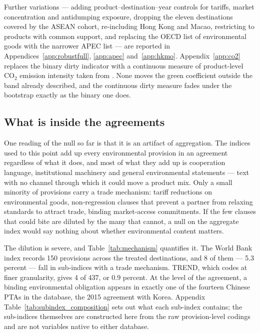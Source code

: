 \documentclass[12pt]{article}
\begin{document}
Further variations --- adding product--destination--year controls for tariffs, market concentration
and antidumping exposure, dropping the eleven destinations covered by the ASEAN cohort, re-including
Hong Kong and Macao, restricting to products with common support, and replacing the OECD list of
environmental goods with the narrower APEC list --- are reported in
Appendices~\ref{app:robustfull}, \ref{app:apec} and~\ref{app:hkmo}. Appendix~\ref{app:co2} replaces
the binary dirty indicator with a continuous measure of product-level CO$_2$ emission intensity taken
from \citet{shapiro2021}. None moves the green coefficient outside the band already described, and
the continuous dirty measure fades under the bootstrap exactly as the binary one does.



\FloatBarrier
\subsection{What is inside the agreements}\label{sec:bundling}

One reading of the null so far is that it is an artifact of aggregation. The indices used to this
point add up every environmental provision in an agreement regardless of what it does, and most of
what they add up is cooperation language, institutional machinery and general environmental
statements --- text with no channel through which it could move a product mix. Only a small minority
of provisions carry a trade mechanism: tariff reductions on environmental goods, non-regression
clauses that prevent a partner from relaxing standards to attract trade, binding market-access
commitments. If the few clauses that could bite are diluted by the many that cannot, a null on the
aggregate index would say nothing about whether environmental content matters.

The dilution is severe, and Table~\ref{tab:mechanism} quantifies it. The World Bank index records 150
provisions across the treated destinations, and 8 of them --- 5.3 percent --- fall in
sub-indices with a trade mechanism. TREND, which codes at finer granularity, gives 4 of 437, or 0.9
percent. At the level of the agreement, a binding environmental obligation appears in exactly one of
the fourteen Chinese PTAs in the database, the 2015 agreement with Korea. Appendix
Table~\ref{tab:subindex_composition} sets out what each sub-index contains; the sub-indices
themselves are constructed here from the raw provision-level codings and are not variables
native to either database.
\end{document}
